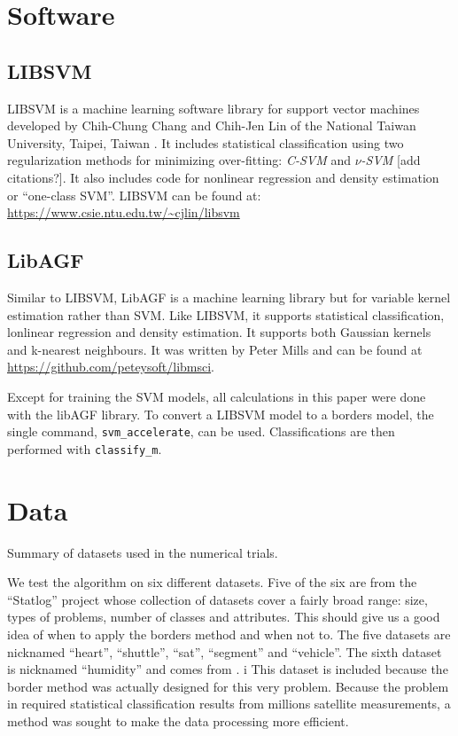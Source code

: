 \documentclass[11pt]{article}
\begin{document}
\section{Software}

\subsection{LIBSVM}

LIBSVM is a machine learning software library for support vector machines 
developed by Chih-Chung Chang and Chih-Jen Lin of 
the National Taiwan University, Taipei, Taiwan \citep{Chang_Lin2011}.
It includes statistical classification using two regularization methods 
for minimizing over-fitting: 
{\it C-SVM} and {\it $\nu$-SVM} [add citations?].
It also includes code for nonlinear regression and density estimation or
``one-class SVM''.
LIBSVM can be found at: \url{https://www.csie.ntu.edu.tw/~cjlin/libsvm}

\subsection{LibAGF}

Similar to LIBSVM, LibAGF is a machine learning library but for variable kernel 
estimation \citep{Mills2011,Terrell_Scott1992} rather than SVM.
Like LIBSVM, it supports statistical classification, lonlinear regression
and density estimation.
It supports both Gaussian kernels and k-nearest neighbours.
It was written by Peter Mills and can be found at
\url{https://github.com/peteysoft/libmsci}.

Except for training the SVM models, all calculations in this paper were done 
with the libAGF library. To convert a LIBSVM model to a borders model,
the single command, \verb/svm_accelerate/, can be used.
Classifications are then performed with \verb/classify_m/.

\section{Data}

\label{datasets}

\begin{table}
	
	\caption{Summary of datasets used in the numerical trials.}
\end{table}

We test the algorithm on six different datasets. Five of the six are from
the ``Statlog'' project \citep{King_etal1995} whose collection of datasets 
cover a fairly broad range: size, types of problems, number of classes and attributes.
This should give us a good idea of when to apply the borders method and when not
to. 
The five datasets are nicknamed ``heart'', ``shuttle'', ``sat'', ``segment''
and ``vehicle''.
The sixth dataset is nicknamed ``humidity'' and comes from \citet{Mills2009}. i
This dataset is included 
because the border method was actually designed for this very problem.
Because the problem in \citet{Mills2009} required statistical classification results from
millions satellite measurements, a method was sought to make the data processing
more efficient.
\end{document}

